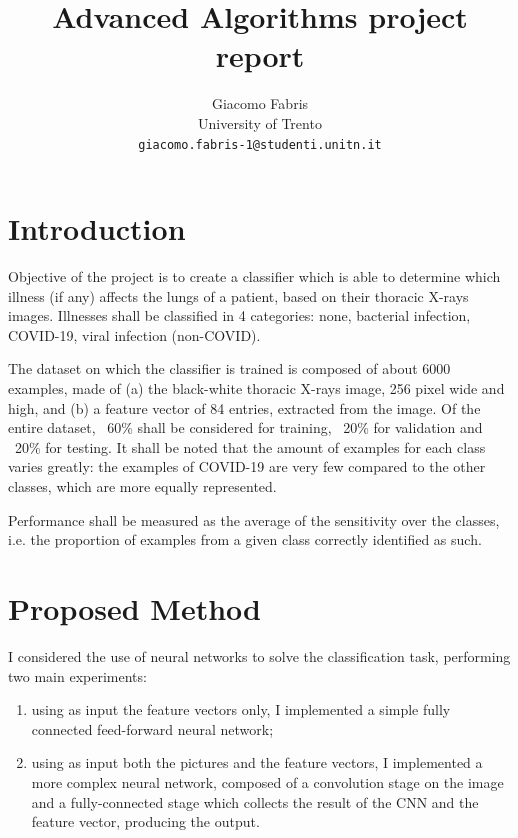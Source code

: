 \documentclass[10pt,a4paper,twocolumn]{article}
\begin{document}
\title{\textsf{Advanced Algorithms project report}}

\author{Giacomo Fabris\\
University of Trento\\
{\tt\small giacomo.fabris-1@studenti.unitn.it}
}

\maketitle

\section{Introduction}

Objective of the project is to create a classifier which is able to determine which illness (if any) affects the lungs of a patient, based on their thoracic X-rays images. Illnesses shall be classified in 4 categories: none, bacterial infection, COVID-19, viral infection (non-COVID).

The dataset on which the classifier is trained is composed of about 6000 examples, made of (a) the black-white thoracic X-rays image, 256 pixel wide and high, and (b) a feature vector of 84 entries, extracted from the image. Of the entire dataset, ~60\% shall be considered for training, ~20\% for validation and ~20\% for testing. It shall be noted that the amount of examples for each class varies greatly: the examples of COVID-19 are very few compared to the other classes, which are more equally represented.

Performance shall be measured as the average of the sensitivity over the classes, i.e. the proportion of examples from a given class correctly identified as such. 

\section{Proposed Method}

I considered the use of neural networks to solve the classification task, performing two main experiments:
\begin{enumerate}
    \item using as input the feature vectors only, I implemented a simple fully connected feed-forward neural network;
    \item using as input both the pictures and the feature vectors, I implemented a more complex neural network, composed of a convolution stage on the image and a fully-connected stage which collects the result of the CNN and the feature vector, producing the output.
\end{enumerate}
\end{document}
